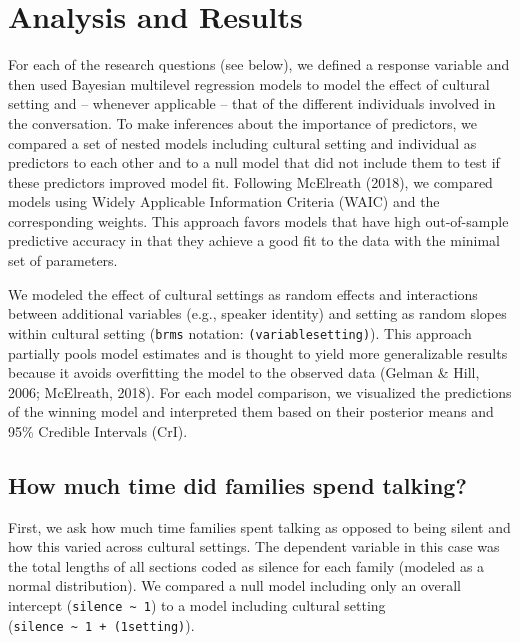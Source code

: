 \documentclass[
  man,floatsintext]{apa6}
\begin{document}
\hypertarget{analysis-and-results}{%
\section{Analysis and Results}\label{analysis-and-results}}

For each of the research questions (see below), we defined a response variable and then used Bayesian multilevel regression models to model the effect of cultural setting and -- whenever applicable -- that of the different individuals involved in the conversation. To make inferences about the importance of predictors, we compared a set of nested models including cultural setting and individual as predictors to each other and to a null model that did not include them to test if these predictors improved model fit. Following McElreath (2018), we compared models using Widely Applicable Information Criteria (WAIC) and the corresponding weights. This approach favors models that have high out-of-sample predictive accuracy in that they achieve a good fit to the data with the minimal set of parameters.

We modeled the effect of cultural settings as random effects and interactions between additional variables (e.g., speaker identity) and setting as random slopes within cultural setting (\texttt{brms} notation: \texttt{(variable\textbar{}setting)}). This approach partially pools model estimates and is thought to yield more generalizable results because it avoids overfitting the model to the observed data (Gelman \& Hill, 2006; McElreath, 2018). For each model comparison, we visualized the predictions of the winning model and interpreted them based on their posterior means and 95\% Credible Intervals (CrI).

\hypertarget{how-much-time-did-families-spend-talking}{%
\subsection{How much time did families spend talking?}\label{how-much-time-did-families-spend-talking}}

First, we ask how much time families spent talking as opposed to being silent and how this varied across cultural settings. The dependent variable in this case was the total lengths of all sections coded as silence for each family (modeled as a normal distribution). We compared a null model including only an overall intercept (\texttt{silence\ \textasciitilde{}\ 1}) to a model including cultural setting (\texttt{silence\ \textasciitilde{}\ 1\ +\ (1\textbar{}setting)}).
\end{document}
